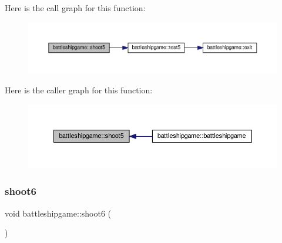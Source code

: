 Here is the call graph for this function\+:
\nopagebreak
\begin{figure}[H]
\begin{center}
\leavevmode
\includegraphics[width=350pt]{classbattleshipgame_a31f1aecdbcbff314bb1c36fd0af2691a_cgraph}
\end{center}
\end{figure}
Here is the caller graph for this function\+:
\nopagebreak
\begin{figure}[H]
\begin{center}
\leavevmode
\includegraphics[width=350pt]{classbattleshipgame_a31f1aecdbcbff314bb1c36fd0af2691a_icgraph}
\end{center}
\end{figure}
\mbox{\label{classbattleshipgame_a1af239789255b2d3c6b33789ccffae35}} 
\subsubsection{\texorpdfstring{shoot6}{shoot6}}
{\footnotesize\ttfamily void battleshipgame\+::shoot6 (\begin{DoxyParamCaption}{ }\end{DoxyParamCaption})\hspace{0.3cm}{\ttfamily [slot]}}

